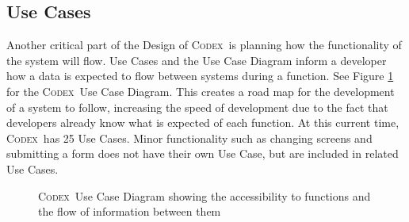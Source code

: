 \documentclass[progress]{cmpreport}
\newcommand{\Codex}{\textsc{Codex}}
\begin{document}
		\subsection{Use Cases}
		Another critical part of the Design of \Codex \ is planning how the functionality of the system will flow. Use Cases and the Use Case Diagram inform a developer how a data is expected to flow between systems during a function. See Figure \ref{fig:use-case-diag} for the \Codex \ Use Case Diagram. This creates a road map for the development of a system to follow, increasing the speed of development due to the fact that developers already know what is expected of each function. At this current time, \Codex \ has 25 Use Cases. Minor functionality such as changing screens and submitting a form does not have their own Use Case, but are included in related Use Cases. 
		
		\begin{figure}
			\centering
			\caption{\Codex \ Use Case Diagram showing the accessibility to functions and the flow of information between them} \label{fig:use-case-diag}
		\end{figure}
	
\end{document}
